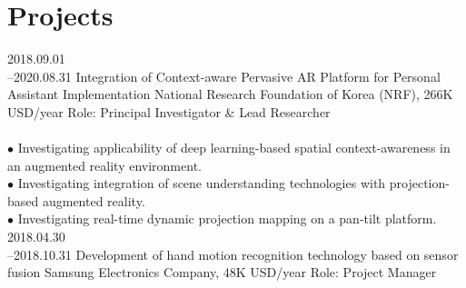\documentclass[]{friggeri-cv}
\begin{document}
\section{Projects}

\begin{entrylist}
  \entry
    {2018.09.01\\--2020.08.31} %
    {Integration of Context-aware Pervasive AR Platform for Personal Assistant Implementation}
    {National Research Foundation of Korea (NRF), 266K USD/year}
    {Role: Principal Investigator \& Lead Researcher\\
    \\
    $\bullet$ Investigating applicability of deep learning-based spatial context-awareness in an augmented reality environment.\\
    $\bullet$ Investigating integration of  scene understanding technologies with projection-based augmented reality.\\
    $\bullet$ Investigating real-time dynamic projection mapping on a pan-tilt platform.
    }
  \entry
    {2018.04.30\\--2018.10.31}
    {Development of hand motion recognition technology based on sensor fusion}
    {Samsung Electronics Company, 48K USD/year}
    {Role: Project Manager\\
    
}
\end{entrylist}
\end{document}

